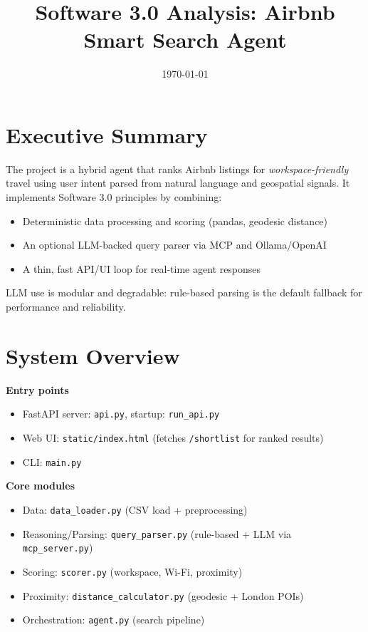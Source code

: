 \documentclass[11pt]{article}
\title{Software 3.0 Analysis: Airbnb Smart Search Agent}
\author{}
\date{\today}
\begin{document}
\maketitle

\section*{Executive Summary}
The project is a hybrid agent that ranks Airbnb listings for \emph{workspace-friendly} travel using user intent parsed from natural language and geospatial signals. It implements Software 3.0 principles by combining:
\begin{itemize}
  \item Deterministic data processing and scoring (pandas, geodesic distance)
  \item An optional LLM-backed query parser via MCP and Ollama/OpenAI
  \item A thin, fast API/UI loop for real-time agent responses
\end{itemize}
LLM use is modular and degradable: rule-based parsing is the default fallback for performance and reliability.

\section{System Overview}
\textbf{Entry points}
\begin{itemize}
  \item FastAPI server: \texttt{api.py}, startup: \texttt{run{\_}api.py}
  \item Web UI: \texttt{static/index.html} (fetches \texttt{/shortlist} for ranked results)
  \item CLI: \texttt{main.py}
\end{itemize}
\textbf{Core modules}
\begin{itemize}
  \item Data: \texttt{data{\_}loader.py} (CSV load + preprocessing)
  \item Reasoning/Parsing: \texttt{query{\_}parser.py} (rule-based + LLM via \texttt{mcp{\_}server.py})
  \item Scoring: \texttt{scorer.py} (workspace, Wi-Fi, proximity)
  \item Proximity: \texttt{distance{\_}calculator.py} (geodesic + London POIs)
  \item Orchestration: \texttt{agent.py} (search pipeline)
\end{itemize}
\end{document}
